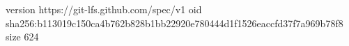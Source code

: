 version https://git-lfs.github.com/spec/v1
oid sha256:b113019c150ca4b762b828b1bb22920e780444d1f1526eaccfd37f7a969b78f8
size 624
